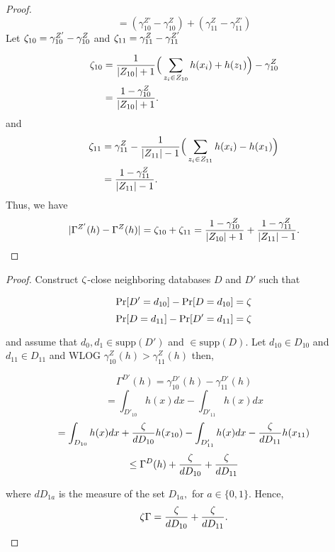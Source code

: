 \begin{proof}
$$=(\gamma_{10}^{Z'}- \gamma_{10}^{Z}) + (\gamma_{11}^{Z} -\gamma_{11}^{Z'})$$
%
Let $\zeta_{10}= \gamma_{10}^{Z'}- \gamma_{10}^{Z}$ and  $\zeta_{11} = \gamma_{11}^{Z} -\gamma_{11}^{Z'}$

\begin{align*}
	\zeta_{10} &= \frac{1}{|Z_{10}|+1} \Big( \sum_{z_i \in Z_{10}} h(x_i)+h(z_1) \Big) - \gamma_{10}^{Z} \\
	&= \frac{1 - \gamma_{10}^Z}{|Z_{10}| + 1}.
\end{align*}
%
and
\begin{align*}
	\zeta_{11} &= \gamma_{11}^{Z}- \frac{1}{|Z_{11}|-1} \Big(\sum_{z_i \in Z_{11}} h(x_i)-h(x_1) \Big) \\
	&=\frac{1 -\gamma_{11}^Z}{|Z_{11}| - 1}.
\end{align*}
%
Thus, we have
$$|\Gamma^{Z'}(h)- \Gamma^{Z}(h)| = \zeta_{10} + \zeta_{11}= \frac{1 - \gamma_{10}^Z}{|Z_{10}|+1} + \frac{1 - \gamma_{11}^Z}{|Z_{11}|-1}. $$
\end{proof}

\begin{proof}
Construct $\zeta$-close neighboring databases $D$ and $D'$ such that

$$\Pr[D'=d_{10}] - \Pr[D=d_{10}] = \zeta$$
$$\Pr[D=d_{11}] - \Pr[D'=d_{11}] = \zeta$$

and assume that $d_0, d_1 \in \text{supp}(D')$ and $\in \text{supp}(D)$. Let $d_{10} \in D_{10}$ and $d_{11} \in D_{11}$ and WLOG $\gamma_{10}^Z(h) > \gamma_{11}^Z(h)$ then,

$$\Gamma^{D'}(h) = \gamma_{10}^{D'}(h) - \gamma_{11}^{D'}(h)$$
$$= \int_{D'_{10}}h(x)dx - \int_{D'_{11}}h(x)dx$$
$$= \int_{D_{10}}h(x)dx + \frac{\zeta}{dD_{10}}h(x_{10}) - \int_{D'_{11}}h(x)dx - \frac{\zeta}{dD_{11}}h(x_{11})$$
$$\leq \Gamma^{D}(h) + \frac{\zeta}{dD_{10}} + \frac{\zeta}{dD_{11}}$$

where $dD_{1a}$ is the measure of the set $D_{1a},$ for $a \in \{0,1\}$. Hence,
$$\zeta\Gamma = \frac{\zeta}{dD_{10}} + \frac{\zeta}{dD_{11}}.$$
\end{proof}
